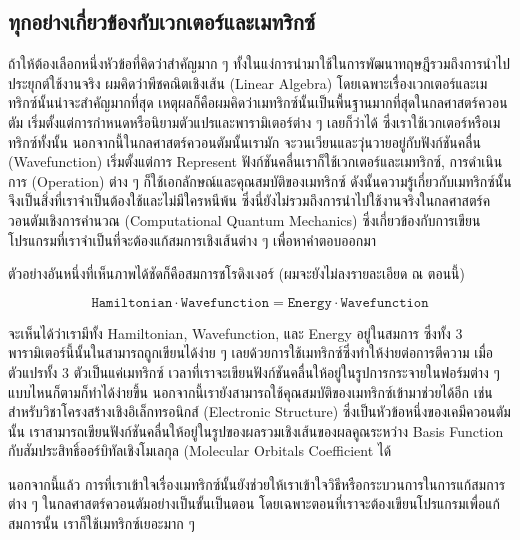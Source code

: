 \subsection{ทุกอย่างเกี่ยวข้องกับเวกเตอร์และเมทริกซ์}

ถ้าให้ต้องเลือกหนึ่งหัวข้อที่คิดว่าสำคัญมาก ๆ ทั้งในแง่การนำมาใช้ในการพัฒนาทฤษฎีรวมถึงการนำไปประยุกต์ใช้งานจริง ผมคิดว่าพีชคณิตเชิงเส้น
(Linear Algebra) โดยเฉพาะเรื่องเวกเตอร์และเมทริกซ์นั้นน่าจะสำคัญมากที่สุด เหตุผลก็คือผมคิดว่าเมทริกซ์นั้นเป็นพื้นฐานมากที่สุดในกลศาสตร์ควอนตัม
เริ่มตั้งแต่การกำหนดหรือนิยามตัวแปรและพารามิเตอร์ต่าง ๆ เลยก็ว่าได้ ซึ่งเราใช้เวกเตอร์หรือเมทริกซ์ทั้งนั้น นอกจากนี้ในกลศาสตร์ควอนตัมนั้นเรามัก%
จะวนเวียนและวุ่นวายอยู่กับฟังก์ชันคลื่น (Wavefunction) เริ่มตั้งแต่การ Represent ฟังก์ชันคลื่นเราก็ใช้เวกเตอร์และเมทริกซ์, การดำเนินการ
(Operation) ต่าง ๆ ก็ใช้เอกลักษณ์และคุณสมบัติของเมทริกซ์ ดังนั้นความรู้เกี่ยวกับเมทริกซ์นั้นจึงเป็นสิ่งที่เราจำเป็นต้องใช้และไม่มีใครหนีพ้น
ซึ่งนี่ยังไม่รวมถึงการนำไปใช้งานจริงในกลศาสตร์ควอนตัมเชิงการคำนวณ (Computational Quantum Mechanics) ซึ่งเกี่ยวข้องกับการเขียน%
โปรแกรมที่เราจำเป็นที่จะต้องแก้สมการเชิงเส้นต่าง ๆ เพื่อหาคำตอบออกมา

ตัวอย่างอันหนึ่งที่เห็นภาพได้ชัดก็คือสมการชโรดิงเงอร์ (ผมจะยังไม่ลงรายละเอียด ณ ตอนนี้)

\begin{equation}
    \texttt{Hamiltonian} \cdot \texttt{Wavefunction}
    =
    \texttt{Energy} \cdot \texttt{Wavefunction}
\end{equation}

\noindent จะเห็นได้ว่าเรามีทั้ง Hamiltonian, Wavefunction, และ Energy อยู่ในสมการ ซึ่งทั้ง 3 พารามิเตอร์นี้นั้นในสามารถถูกเขียนได้ง่าย ๆ
เลยด้วยการใช้เมทริกซ์ซึ่งทำให้ง่ายต่อการตีความ เมื่อตัวแปรทั้ง 3 ตัวเป็นแค่เมทริกซ์ เวลาที่เราจะเขียนฟังก์ชันคลื่นให้อยู่ในรูปการกระจายในฟอร์มต่าง ๆ
แบบไหนก็ตามก็ทำได้ง่ายขึ้น นอกจากนี้เรายังสามารถใช้คุณสมบัติของเมทริกซ์เข้ามาช่วยได้อีก เช่น สำหรับวิชาโครงสร้างเชิงอิเล็กทรอนิกส์ (Electronic
Structure) ซึ่งเป็นหัวข้อหนึ่งของเคมีควอนตัมนั้น เราสามารถเขียนฟังก์ชันคลื่นให้อยู่ในรูปของผลรวมเชิงเส้นของผลคูณระหว่าง Basis Function
กับสัมประสิทธิ์ออร์บิทัลเชิงโมเลกุล (Molecular Orbitals Coefficient ได้

นอกจากนี้แล้ว การที่เราเข้าใจเรื่องเมทริกซ์นั้นยังช่วยให้เราเข้าใจวิธีหรือกระบวนการในการแก้สมการต่าง ๆ ในกลศาสตร์ควอนตัมอย่างเป็นขั้นเป็นตอน
โดยเฉพาะตอนที่เราจะต้องเขียนโปรแกรมเพื่อแก้สมการนั้น เราก็ใช้เมทริกซ์เยอะมาก ๆ

